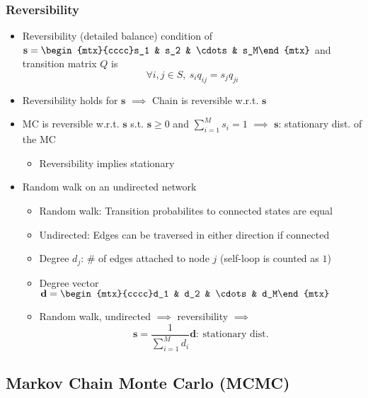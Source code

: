 \subsubsection*{Reversibility}
\begin{itemize}
    \item Reversibility (detailed balance) condition of $\mathbf{s}=\begin{mtx}{cccc}s_1 & s_2 & \cdots & s_M\end{mtx}$ and transition matrix $Q$ is
    \begin{equation}
        \forall i,j\in S,~s_iq_{ij}=s_jq_{ji}
    \end{equation}
    \item Reversibility holds for $\mathbf{s}$ $\implies$ Chain is reversible w.r.t. $\mathbf{s}$
    \item MC is reversible w.r.t. $\mathbf{s}$ s.t. $\mathbf{s}\geq 0$ and $\sum_{i=1}^Ms_i=1$ $\implies$ $\mathbf{s}$: stationary dist. of the MC
    \begin{itemize}
        \item Reversibility implies stationary
    \end{itemize}
    \item Random walk on an undirected network
    \begin{itemize}
        \item Random walk: Transition probabilites to connected states are equal
        \item Undirected: Edges can be traversed in either direction if connected
        \item Degree $d_j$: \# of edges attached to node $j$ (self-loop is counted as $1$)
        \item Degree vector $\mathbf{d}=\begin{mtx}{cccc}d_1 & d_2 & \cdots & d_M\end{mtx}$
        \item Random walk, undirected $\implies$ reversibility $\implies$
        \begin{equation}
            \mathbf{s}=\frac{1}{\sum_{i=1}^Md_i}\mathbf{d}:~\text{stationary dist.}
        \end{equation}
    \end{itemize}
\end{itemize}

\subsection{Markov Chain Monte Carlo (MCMC)}

